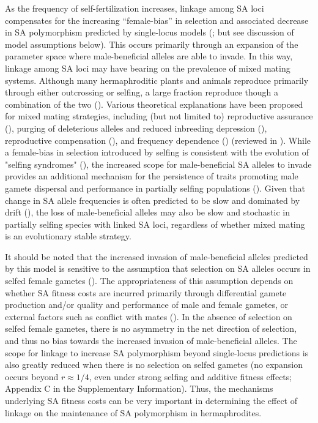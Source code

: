 \documentclass{article}
\begin{document}
As the frequency of self-fertilization increases, linkage among SA loci compensates for the increasing ``female-bias'' in selection and associated decrease in SA polymorphism predicted by single-locus models (\citealt{Charlesworth1978, JordanConn2014}; but see discussion of model assumptions below). This occurs primarily through an expansion of the parameter space where male-beneficial alleles are able to invade. In this way, linkage among SA loci may have bearing on the prevalence of mixed mating systems. Although many hermaphroditic plants and animals reproduce primarily through either outcrossing or selfing, a large fraction reproduce though a combination of the two (\citealt{JarneAuld2006, Goodwillie2005, Igic2005}). Various theoretical explanations have been proposed for mixed mating strategies, including (but not limited to) reproductive assurance (\citealt{Lloyd1979}), purging of deleterious alleles and reduced inbreeding depression (\citealt{LandeSchemske1985}), reproductive compensation (\citealt{HarderRoutley2007, PorcherLande2005}), and frequency dependence (\citealt{Holsinger1991}) (reviewed in \citealt{Goodwillie2005, HarderBarrett2006}). While a female-bias in selection introduced by selfing is consistent with the evolution of "selfing syndromes" (\citealt{Sicard2011,JordanConn2014}), the increased scope for male-beneficial SA alleles to invade provides an additional mechanism for the persistence of traits promoting male gamete dispersal and performance in partially selfing populations (\citealt{Barrett2002, Goodwillie2005, HarderBarrett2006}). Given that change in SA allele frequencies is often predicted to be slow and dominated by drift (\citealt{ConnClark2011, ConnClark2012, ConnClark2014}), the loss of male-beneficial alleles may also be slow and stochastic in partially selfing species with linked SA loci, regardless of whether mixed mating is an evolutionary stable strategy.

It should be noted that the increased invasion of male-beneficial alleles predicted by this model is sensitive to the assumption that selection on SA alleles occurs in selfed female gametes (\citealt{Tazzyman2015}). The appropriateness of this assumption depends on whether SA fitness costs are incurred primarily through differential gamete production and/or quality and performance of male and female gametes, or external factors such as conflict with mates (\citealt{Tazzyman2015}). In the absence of selection on selfed female gametes, there is no asymmetry in the net direction of selection, and thus no bias towards the increased invasion of male-beneficial alleles. The scope for linkage to increase SA polymorphism beyond single-locus predictions is also greatly reduced when there is no selection on selfed gametes (no expansion occurs beyond $r \approx 1/4$, even under strong selfing and additive fitness effects; Appendix C in the Supplementary Information). Thus, the mechanisms underlying SA fitness costs can be very important in determining the effect of linkage on the maintenance of SA polymorphism in hermaphrodites.
\end{document}
